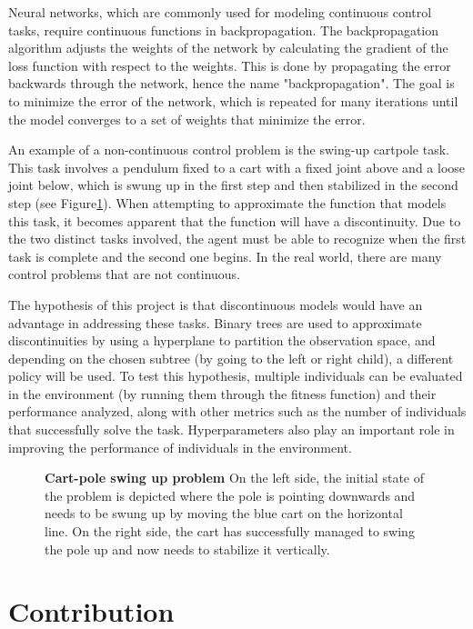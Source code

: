 Neural networks, which are commonly used for modeling continuous control tasks, require continuous functions in backpropagation. The backpropagation algorithm adjusts the weights of the network by calculating the gradient of the loss function with respect to the weights. This is done by propagating the error backwards through the network, hence the name "backpropagation". The goal is to minimize the error of the network, which is repeated for many iterations until the model converges to a set of weights that minimize the error.

An example of a non-continuous control problem is the swing-up cartpole task. This task involves a pendulum fixed to a cart with a fixed joint above and a loose joint below, which is swung up in the first step and then stabilized in the second step (see Figure\ref{fig:swing_up}). When attempting to approximate the function that models this task, it becomes apparent that the function will have a discontinuity. Due to the two distinct tasks involved, the agent must be able to recognize when the first task is complete and the second one begins. In the real world, there are many control problems that are not continuous.

The hypothesis of this project is that discontinuous models would have an advantage in addressing these tasks. Binary trees are used to approximate discontinuities by using a hyperplane to partition the observation space, and depending on the chosen subtree (by going to the left or right child), a different policy will be used. To test this hypothesis, multiple individuals can be evaluated in the environment (by running them through the fitness function) and their performance analyzed, along with other metrics such as the number of individuals that successfully solve the task. Hyperparameters also play an important role in improving the performance of individuals in the environment.

\begin{figure}[!ht]
\centering
{}
\caption[Non-continuous control task]{
  \textbf{Cart-pole swing up problem} On the left side, the initial state of the problem is depicted where the pole is pointing downwards and needs to be swung up by moving the blue cart on the horizontal line. On the right side, the cart has successfully managed to swing the pole up and now needs to stabilize it vertically.
  }
\label{fig:swing_up}
\end{figure}

\section{Contribution}

